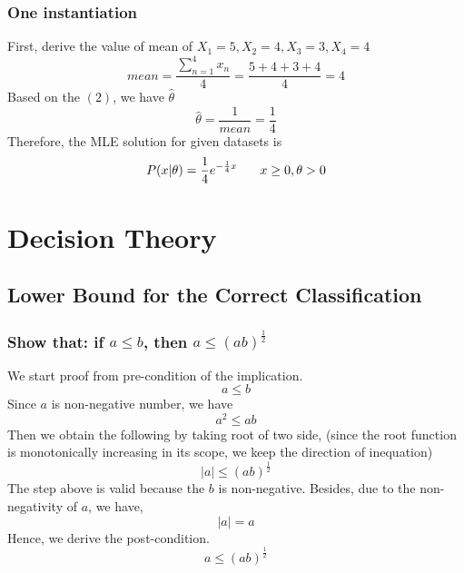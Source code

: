 \documentclass[11pt,a4paper]{article}
\newcommand{\htab}{\hspace*{0.63cm}}
\begin{document}
\subsubsection{One instantiation}
\htab First, derive the value of mean of $X_{1}=5, X_{2}=4, X_{3}=3, X_{4}=4$
    \begin{equation}
        mean = \frac{\sum_{n=1}^{4} {x_{n}}}{4}  = \frac{5 + 4 + 3 + 4}{4} = 4 
    \end{equation}
\htab Based on the $(2)$, we have $\hat{\theta}$
    \begin{equation}
        \hat{\theta} = \frac{1}{mean} = \frac{1}{4}
    \end{equation}
\htab Therefore, the MLE solution for given datasets is 
    \begin{equation}
        P(x|\theta) = \frac{1}{4} e^{-\frac{1}{4} x} \htab x \geq 0, \theta > 0 
    \end{equation}
\newpage
\section{Decision Theory}
\subsection{Lower Bound for the Correct Classification}
\subsubsection{Show that: if $a \leq b$, then $ a \leq (ab)^{\frac{1}{2}} $}
\htab We start proof from pre-condition of the implication.
    \begin{equation}    a \leq b    \end{equation}
\htab Since $a$ is non-negative number, we have 
    \begin{equation}    a^{2} \leq ab   \end{equation}
\htab Then we obtain the following by taking root of two side, (since the root function is monotonically increasing in its scope, we keep the direction of inequation)
    \begin{equation}    |a| \leq (ab)^{\frac{1}{2}}     \end{equation}
\htab The step above is valid because the $b$ is non-negative. Besides, due to the non-negativity of $a$, we have,
    \begin{equation}    |a| = a    \end{equation}
\htab Hence, we derive the post-condition.
    \begin{equation} a \leq (ab)^{\frac{1}{2}} \end{equation}
\end{document}
